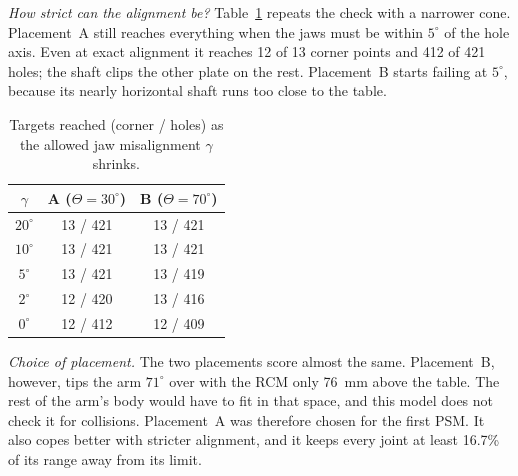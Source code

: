 \textit{How strict can the alignment be?} Table~\ref{tab:cone} repeats the
check with a narrower cone. Placement~A still reaches everything when the
jaws must be within $5^\circ$ of the hole axis. Even at exact alignment it
reaches 12 of 13 corner points and 412 of 421 holes; the shaft clips the
other plate on the rest. Placement~B starts failing at $5^\circ$, because its
nearly horizontal shaft runs too close to the table.

\begin{table}[t]
\centering
\caption{Targets reached (corner / holes) as the allowed jaw misalignment
$\gamma$ shrinks.}
\label{tab:cone}
\footnotesize
\begin{tabular}{@{}ccc@{}}
\hline
$\gamma$ & A ($\Theta=30^\circ$) & B ($\Theta=70^\circ$)\\
\hline
$20^\circ$ & 13 / 421 & 13 / 421\\
$10^\circ$ & 13 / 421 & 13 / 421\\
$5^\circ$  & 13 / 421 & 13 / 419\\
$2^\circ$  & 12 / 420 & 13 / 416\\
$0^\circ$  & 12 / 412 & 12 / 409\\
\hline
\end{tabular}
\end{table}

\textit{Choice of placement.} The two placements score almost the same.
Placement~B, however, tips the arm $71^\circ$ over with the RCM only
\SI{76}{mm} above the table. The rest of the arm's body would have to fit in
that space, and this model does not check it for collisions. Placement~A
was therefore chosen for the first PSM. It also copes better with stricter
alignment, and it keeps every joint at least 16.7\% of its range away from
its limit.

